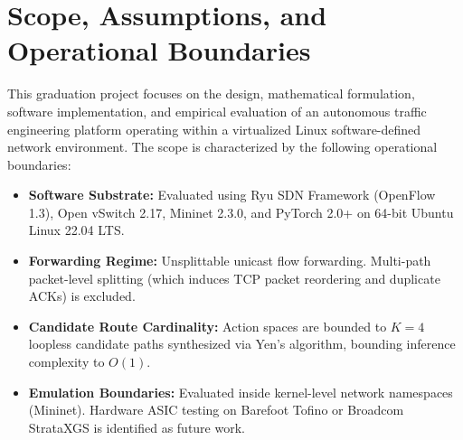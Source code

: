\documentclass[12pt,a4paper,oneside]{report}
\begin{document}
\section{Scope, Assumptions, and Operational Boundaries}
This graduation project focuses on the design, mathematical formulation, software implementation, and empirical evaluation of an autonomous traffic engineering platform operating within a virtualized Linux software-defined network environment.
The scope is characterized by the following operational boundaries:
\begin{itemize}
    \item \textbf{Software Substrate:} Evaluated using Ryu SDN Framework (OpenFlow 1.3), Open vSwitch 2.17, Mininet 2.3.0, and PyTorch 2.0+ on 64-bit Ubuntu Linux 22.04 LTS.
    \item \textbf{Forwarding Regime:} Unsplittable unicast flow forwarding. Multi-path packet-level splitting (which induces TCP packet reordering and duplicate ACKs) is excluded.
    \item \textbf{Candidate Route Cardinality:} Action spaces are bounded to $K = 4$ loopless candidate paths synthesized via Yen's algorithm, bounding inference complexity to $O(1)$.
    \item \textbf{Emulation Boundaries:} Evaluated inside kernel-level network namespaces (Mininet). Hardware ASIC testing on Barefoot Tofino or Broadcom StrataXGS is identified as future work.
\end{itemize}
\end{document}
